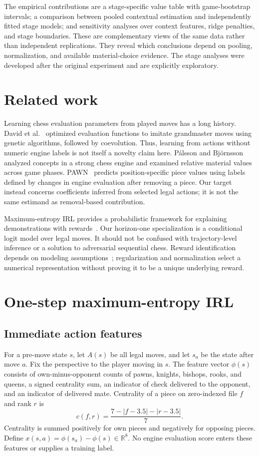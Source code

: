 \documentclass[11pt]{article}
\begin{document}
The empirical contributions are a stage-specific value table with game-bootstrap intervals; a comparison between pooled contextual estimation and independently fitted stage models; and sensitivity analyses over context features, ridge penalties, and stage boundaries. These are complementary views of the same data rather than independent replications. They reveal which conclusions depend on pooling, normalization, and available material-choice evidence. The stage analyses were developed after the original experiment and are explicitly exploratory.

\section{Related work}

Learning chess evaluation parameters from played moves has a long history. David et al.\ \cite{david} optimized evaluation functions to imitate grandmaster moves using genetic algorithms, followed by coevolution. Thus, learning from actions without numeric engine labels is not itself a novelty claim here. P\'alsson and Bj\"ornsson\ \cite{palsson} analyzed concepts in a strong chess engine and examined relative material values across game phases. PAWN\ \cite{pawn} predicts position-specific piece values using labels defined by changes in engine evaluation after removing a piece. Our target instead concerns coefficients inferred from selected legal actions; it is not the same estimand as removal-based contribution.

Maximum-entropy IRL provides a probabilistic framework for explaining demonstrations with rewards\ \cite{ziebart}. Our horizon-one specialization is a conditional logit model over legal moves. It should not be confused with trajectory-level inference or a solution to adversarial sequential chess. Reward identification depends on modeling assumptions\ \cite{kim}; regularization and normalization select a numerical representation without proving it to be a unique underlying reward.

\section{One-step maximum-entropy IRL}
\subsection{Immediate action features}
For a pre-move state $s$, let $A(s)$ be all legal moves, and let $s_a$ be the state after move $a$. Fix the perspective to the player moving in $s$. The feature vector $\phi(s)$ consists of own-minus-opponent counts of pawns, knights, bishops, rooks, and queens, a signed centrality sum, an indicator of check delivered to the opponent, and an indicator of delivered mate. Centrality of a piece on zero-indexed file $f$ and rank $r$ is
\[
c(f,r)=\frac{7-|f-3.5|-|r-3.5|}{7}.
\]
Centrality is summed positively for own pieces and negatively for opposing pieces. Define $x(s,a)=\phi(s_a)-\phi(s)\in\mathbb R^8$. No engine evaluation score enters these features or supplies a training label.
\end{document}
